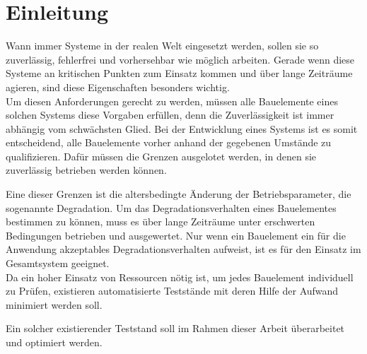 
\chapter{Einleitung}
\label{chapter_einleitung}

Wann immer Systeme in der realen Welt eingesetzt werden, sollen sie so zuverlässig, fehlerfrei und vorhersehbar wie möglich arbeiten. Gerade wenn diese Systeme an kritischen Punkten zum Einsatz kommen und über lange Zeiträume agieren, sind diese Eigenschaften besonders wichtig.\\
Um diesen Anforderungen gerecht zu werden, müssen alle Bauelemente eines solchen Systems diese Vorgaben erfüllen, denn die Zuverlässigkeit ist immer abhängig vom schwächsten Glied.
Bei der Entwicklung eines Systems ist es somit entscheidend, alle Bauelemente vorher anhand der gegebenen Umstände zu qualifizieren. Dafür müssen die Grenzen ausgelotet werden, in denen sie zuverlässig betrieben werden können.

Eine dieser Grenzen ist die altersbedingte Änderung der Betriebsparameter, die sogenannte Degradation.
Um das Degradationsverhalten eines Bauelementes bestimmen zu können, muss es über lange Zeiträume unter erschwerten Bedingungen betrieben und ausgewertet. Nur wenn ein Bauelement ein für die Anwendung akzeptables Degradationsverhalten aufweist, ist es für den Einsatz im Gesamtsystem geeignet.\\
Da ein hoher Einsatz von Ressourcen nötig ist, um jedes Bauelement individuell zu Prüfen, existieren automatisierte Teststände mit deren Hilfe der Aufwand minimiert werden soll.
 
Ein solcher existierender Teststand soll im Rahmen dieser Arbeit überarbeitet und optimiert werden.  
